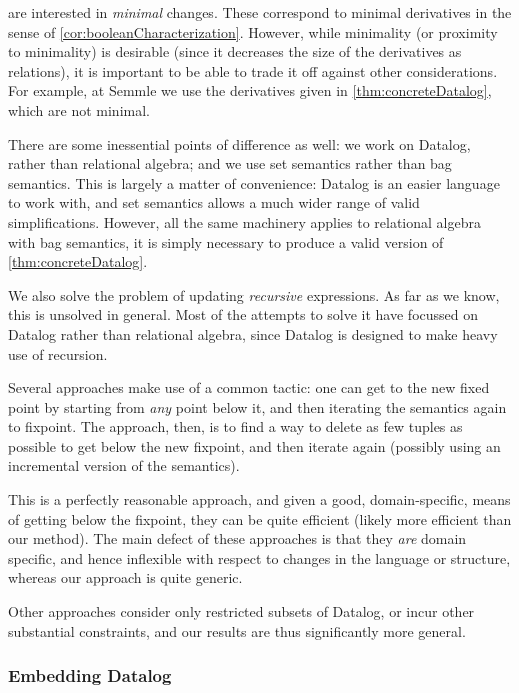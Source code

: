 \citeauthor{griffin1997improved} are interested in \emph{minimal} changes. These correspond to
minimal derivatives in the sense of \cref{cor:booleanCharacterization}. However,
while minimality (or proximity to minimality) is desirable (since it decreases
the size of the derivatives as relations), it is important to be able to trade
it off against other considerations. For example, at
Semmle we use the derivatives given in \cref{thm:concreteDatalog}, which are not minimal.

There are some inessential points of difference as well: we work on Datalog,
rather than relational algebra; and we use set semantics rather than bag
semantics. This is largely a matter of convenience: Datalog is an easier
language to work with, and set semantics allows a much wider range of valid
simplifications. However, all the same machinery applies to relational algebra
with bag semantics, it is simply necessary to produce a valid version of \cref{thm:concreteDatalog}.

We also solve the problem of updating \emph{recursive} expressions. As far as we
know, this is unsolved in general. Most of the attempts to solve it have
focussed on Datalog rather than relational algebra, since Datalog is designed to
make heavy use of recursion.

Several approaches
\autocites{gupta1993maintaining}{harrison1992maintenance}
make use of a common tactic: one can get to the new fixed
point by starting from \emph{any} point below it, and then iterating the
semantics again to fixpoint. The approach, then, is to find a way to delete as
few tuples as possible to get below the new fixpoint, and then iterate again
(possibly using an incremental version of the semantics).

This is a perfectly reasonable approach, and given a good, domain-specific,
means of getting below the fixpoint, they can be quite efficient (likely more
efficient than our method). The main defect of these approaches is that they
\emph{are} domain specific, and hence inflexible with respect to changes in the
language or structure, whereas our approach is quite generic.

Other approaches \autocites{dong2000incremental}{urpi1992method} consider only
restricted subsets of Datalog, or incur other substantial constraints, and our results
are thus significantly more general.

\subsubsection{Embedding Datalog}
\label{sec:embeddingDatalog}

